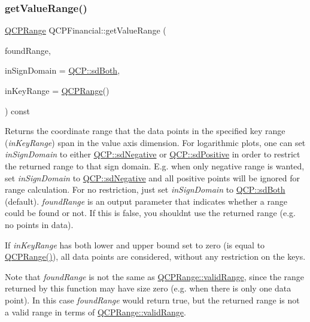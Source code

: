 \subsubsection{\texorpdfstring{get\+Value\+Range()}{getValueRange()}}
{\footnotesize\ttfamily \hyperlink{class_q_c_p_range}{Q\+C\+P\+Range} Q\+C\+P\+Financial\+::get\+Value\+Range (\begin{DoxyParamCaption}\item[{bool \&}]{found\+Range,  }\item[{\hyperlink{namespace_q_c_p_afd50e7cf431af385614987d8553ff8a9}{Q\+C\+P\+::\+Sign\+Domain}}]{in\+Sign\+Domain = {\ttfamily \hyperlink{namespace_q_c_p_afd50e7cf431af385614987d8553ff8a9aa38352ef02d51ddfa4399d9551566e24}{Q\+C\+P\+::sd\+Both}},  }\item[{const \hyperlink{class_q_c_p_range}{Q\+C\+P\+Range} \&}]{in\+Key\+Range = {\ttfamily \hyperlink{class_q_c_p_range}{Q\+C\+P\+Range}()} }\end{DoxyParamCaption}) const\hspace{0.3cm}{\ttfamily [virtual]}}

Returns the coordinate range that the data points in the specified key range ({\itshape in\+Key\+Range}) span in the value axis dimension. For logarithmic plots, one can set {\itshape in\+Sign\+Domain} to either \hyperlink{namespace_q_c_p_afd50e7cf431af385614987d8553ff8a9a2d18af0bc58f6528d1e82ce699fe4829}{Q\+C\+P\+::sd\+Negative} or \hyperlink{namespace_q_c_p_afd50e7cf431af385614987d8553ff8a9a584784b75fb816abcc627cf743bb699f}{Q\+C\+P\+::sd\+Positive} in order to restrict the returned range to that sign domain. E.\+g. when only negative range is wanted, set {\itshape in\+Sign\+Domain} to \hyperlink{namespace_q_c_p_afd50e7cf431af385614987d8553ff8a9a2d18af0bc58f6528d1e82ce699fe4829}{Q\+C\+P\+::sd\+Negative} and all positive points will be ignored for range calculation. For no restriction, just set {\itshape in\+Sign\+Domain} to \hyperlink{namespace_q_c_p_afd50e7cf431af385614987d8553ff8a9aa38352ef02d51ddfa4399d9551566e24}{Q\+C\+P\+::sd\+Both} (default). {\itshape found\+Range} is an output parameter that indicates whether a range could be found or not. If this is false, you shouldn\textquotesingle{}t use the returned range (e.\+g. no points in data).

If {\itshape in\+Key\+Range} has both lower and upper bound set to zero (is equal to {\ttfamily \hyperlink{class_q_c_p_range}{Q\+C\+P\+Range()}}), all data points are considered, without any restriction on the keys.

Note that {\itshape found\+Range} is not the same as \hyperlink{class_q_c_p_range_ab38bd4841c77c7bb86c9eea0f142dcc0}{Q\+C\+P\+Range\+::valid\+Range}, since the range returned by this function may have size zero (e.\+g. when there is only one data point). In this case {\itshape found\+Range} would return true, but the returned range is not a valid range in terms of \hyperlink{class_q_c_p_range_ab38bd4841c77c7bb86c9eea0f142dcc0}{Q\+C\+P\+Range\+::valid\+Range}.

